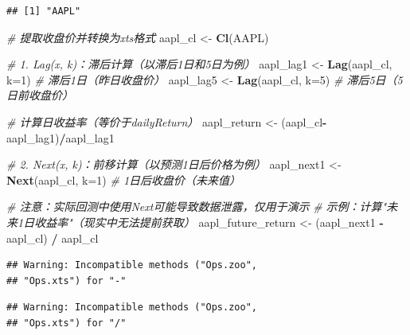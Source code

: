 \documentclass[]{ctexbook}
\newenvironment{Shaded}{\begin{snugshade}}{\end{snugshade}}
\newcommand{\AttributeTok}[1]{\textcolor[rgb]{0.13,0.29,0.53}{#1}}
\newcommand{\CommentTok}[1]{\textcolor[rgb]{0.56,0.35,0.01}{\textit{#1}}}
\newcommand{\DecValTok}[1]{\textcolor[rgb]{0.00,0.00,0.81}{#1}}
\newcommand{\FunctionTok}[1]{\textcolor[rgb]{0.13,0.29,0.53}{\textbf{#1}}}
\newcommand{\NormalTok}[1]{#1}
\newcommand{\OtherTok}[1]{\textcolor[rgb]{0.56,0.35,0.01}{#1}}
\newcommand{\SpecialCharTok}[1]{\textcolor[rgb]{0.81,0.36,0.00}{\textbf{#1}}}
\begin{document}
\begin{verbatim}
## [1] "AAPL"
\end{verbatim}

\begin{Shaded}
\begin{Highlighting}[]
\CommentTok{\# 提取收盘价并转换为xts格式}
\NormalTok{aapl\_cl }\OtherTok{\textless{}{-}} \FunctionTok{Cl}\NormalTok{(AAPL)}

\CommentTok{\# 1. Lag(x, k)：滞后计算（以滞后1日和5日为例）}
\NormalTok{aapl\_lag1 }\OtherTok{\textless{}{-}} \FunctionTok{Lag}\NormalTok{(aapl\_cl, }\AttributeTok{k=}\DecValTok{1}\NormalTok{)     }\CommentTok{\# 滞后1日（昨日收盘价）}
\NormalTok{aapl\_lag5 }\OtherTok{\textless{}{-}} \FunctionTok{Lag}\NormalTok{(aapl\_cl, }\AttributeTok{k=}\DecValTok{5}\NormalTok{)     }\CommentTok{\# 滞后5日（5日前收盘价）}

\CommentTok{\# 计算日收益率（等价于dailyReturn）}
\NormalTok{aapl\_return }\OtherTok{\textless{}{-}}\NormalTok{ (aapl\_cl}\SpecialCharTok{{-}}\NormalTok{aapl\_lag1)}\SpecialCharTok{/}\NormalTok{aapl\_lag1}

\CommentTok{\# 2. Next(x, k)：前移计算（以预测1日后价格为例）}
\NormalTok{aapl\_next1 }\OtherTok{\textless{}{-}} \FunctionTok{Next}\NormalTok{(aapl\_cl, }\AttributeTok{k=}\DecValTok{1}\NormalTok{)   }\CommentTok{\# 1日后收盘价（未来值）}

\CommentTok{\# 注意：实际回测中使用Next可能导致数据泄露，仅用于演示}
\CommentTok{\# 示例：计算"未来1日收益率"（现实中无法提前获取）}
\NormalTok{aapl\_future\_return }\OtherTok{\textless{}{-}}\NormalTok{ (aapl\_next1 }\SpecialCharTok{{-}}\NormalTok{ aapl\_cl) }\SpecialCharTok{/}\NormalTok{ aapl\_cl}
\end{Highlighting}
\end{Shaded}

\begin{verbatim}
## Warning: Incompatible methods ("Ops.zoo",
## "Ops.xts") for "-"
\end{verbatim}

\begin{verbatim}
## Warning: Incompatible methods ("Ops.zoo",
## "Ops.xts") for "/"
\end{verbatim}
\end{document}
